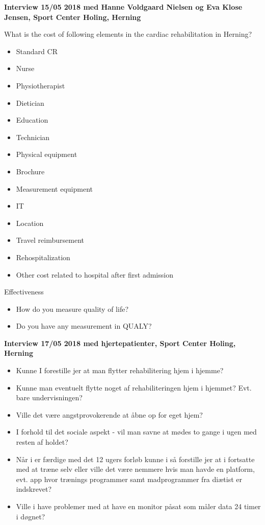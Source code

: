 \textbf{Interview 15/05 2018 med Hanne Voldgaard Nielsen og Eva Klose Jensen, Sport Center Holing, Herning}


What is the cost of following elements in the cardiac rehabilitation in Herning?
\begin{itemize}
	\item Standard CR
	\item Nurse
	\item Physiotherapist
	\item Dietician 
	\item Education
	\item Technician 
	\item Physical equipment
	\item Brochure
	\item Measurement equipment
	\item IT 
	\item Location
	\item Travel reimbursement
	\item Rehospitalization
	\item Other cost related to hospital after first admission
\end{itemize}

Effectiveness
\begin{itemize}
	\item How do you measure quality of life?
	\item Do you have any measurement in QUALY?
\end{itemize}

\textbf{Interview 17/05 2018 med hjertepatienter, Sport Center Holing, Herning}
\begin{itemize}
	\item Kunne I forestille jer at man flytter rehabilitering hjem i hjemme? 
	\item Kunne man eventuelt flytte noget af rehabiliteringen hjem i hjemmet? Evt. bare undervisningen? 
	\item Ville det være angstprovokerende at åbne op for eget hjem? 
	\item I forhold til det sociale aspekt - vil man savne at mødes to gange i ugen med resten af holdet?
	\item Når i er færdige med det 12 ugers forløb kunne i så forstille jer at i fortsatte med at træne selv eller ville det være nemmere hvis man havde en platform, evt. app hvor trænings programmer samt madprogrammer fra diætist er indskrevet? 
	\item Ville i have problemer med at have en monitor påsat som måler data 24 timer i døgnet? 
\end{itemize}
 
